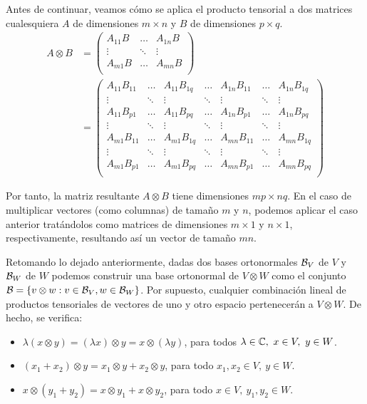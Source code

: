 Antes de continuar, veamos cómo se aplica el producto tensorial a dos matrices cualesquiera $A$ de dimensiones $m\times n$ y $B$ de dimensiones $p\times q$.
$$\begin{aligned}
A\otimes B&=
\left(\begin{matrix}
A_{11}B & \hdots & A_{1n}B \\
\vdots & \ddots & \vdots \\
A_{m1}B & \hdots & A_{mn}B \\
\end{matrix}\right)\\
&=
\left(\begin{matrix}
A_{11}B_{11} & \hdots & A_{11}B_{1q} & \hdots & A_{1n}B_{11} & \hdots & A_{1n}B_{1q} \\
\vdots & \ddots & \vdots & \ddots & \vdots & \ddots & \vdots \\
A_{11}B_{p1} & \hdots & A_{11}B_{pq} & \hdots & A_{1n}B_{p1} & \hdots & A_{1n}B_{pq} \\
\vdots & \ddots & \vdots & \ddots & \vdots & \ddots & \vdots \\
A_{m1}B_{11} & \hdots & A_{m1}B_{1q} & \hdots & A_{mn}B_{11} & \hdots & A_{mn}B_{1q} \\
\vdots & \ddots & \vdots & \ddots & \vdots & \ddots & \vdots \\
A_{m1}B_{p1} & \hdots & A_{m1}B_{pq} & \hdots & A_{mn}B_{p1} & \hdots & A_{mn}B_{pq} \\
\end{matrix}\right)
\end{aligned}
$$

Por tanto, la matriz resultante $A\otimes B$ tiene dimensiones $mp\times nq$. En el caso de multiplicar vectores (como columnas) de tamaño $m$ y $n$, podemos aplicar el caso anterior tratándolos como matrices de dimensiones $m\times 1$ y $n\times 1$, respectivamente, resultando así un vector de tamaño $mn$.

Retomando lo dejado anteriormente, dadas dos bases ortonormales $\mathcal{B}_V$ de $V$ y $\mathcal{B}_W$ de $W$ podemos construir una base ortonormal de $V\otimes W$ como el conjunto $\mathcal{B}=\{v\otimes w:v\in\mathcal{B}_V,w\in\mathcal{B}_W\}$. Por supuesto, cualquier combinación lineal de productos tensoriales de vectores de uno y otro espacio pertenecerán a $V\otimes W$. De hecho, se verifica:

\begin{itemize}
\item $\lambda (x\otimes y) = (\lambda x)\otimes y = x\otimes(\lambda y)$, para todos $\lambda\in\mathbb{C},\ x\in V,\ y\in W$.
\item $(x_1+x_2)\otimes y = x_1\otimes y+x_2\otimes y$, para todo $x_1,x_2\in V,\ y\in W$.
\item $x \otimes(y_1 + y_2)= x\otimes y_1 + x\otimes y_2$, para todo $x\in V,\ y_1,y_2\in W$.
\end{itemize}

